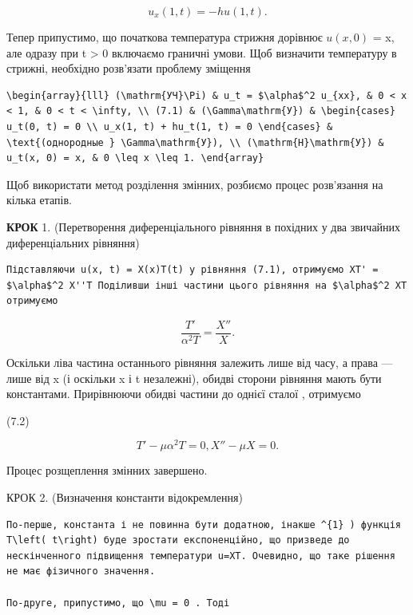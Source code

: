 \documentclass[
  ukrainian,
]{article}
\begin{document}
\[
u_x(1, t) = -hu(1, t).
\]

Тепер припустимо, що початкова температура стрижня дорівнює \(u(x, 0)\)
= x, але одразу при t \textgreater{} 0 включаємо граничні умови. Щоб
визначити температуру в стрижні, необхідно розв'язати проблему зміщення

\begin{verbatim}
\begin{array}{lll} (\mathrm{УЧ}\Pi) & u_t = $\alpha$^2 u_{xx}, & 0 < x < 1, & 0 < t < \infty, \\ (7.1) & (\Gamma\mathrm{У}) & \begin{cases} u_t(0, t) = 0 \\ u_x(1, t) + hu_t(1, t) = 0 \end{cases} & \text{(однородные } \Gamma\mathrm{У}), \\ (\mathrm{H}\mathrm{У}) & u_t(x, 0) = x, & 0 \leq x \leq 1. \end{array}
\end{verbatim}

Щоб використати метод розділення змінних, розбиємо процес розв'язання на
кілька етапів.

\textbf{КРОК} 1. (Перетворення диференціального рівняння в похідних у
два звичайних диференціальних рівняння)

\begin{verbatim}
Підставляючи u(x, t) = X(x)T(t) у рівняння (7.1), отримуємо XT' = $\alpha$^2 X''T Поділивши інші частини цього рівняння на $\alpha$^2 XT отримуємо
\end{verbatim}

\[
\frac{T'}{\alpha^2 T} = \frac{X''}{X} .
\]

Оскільки ліва частина останнього рівняння залежить лише від часу, а
права --- лише від x (і оскільки x і t незалежні), обидві сторони
рівняння мають бути константами. Прирівнюючи обидві частини до однієї
сталої \mu , отримуємо

(7.2)

\[
T' - \mu \alpha^{2} T = 0, X'' - \mu X = 0.
\]

Процес розщеплення змінних завершено.

КРОК 2. (Визначення константи відокремлення)

\begin{verbatim}
По-перше, константа і не повинна бути додатною, інакше ^{1} ) функція T\left( t\right) буде зростати експоненційно, що призведе до нескінченного підвищення температури u=XT. Очевидно, що таке рішення не має фізичного значення.

По-друге, припустимо, що \mu = 0 . Тоді
\end{verbatim}
\end{document}
